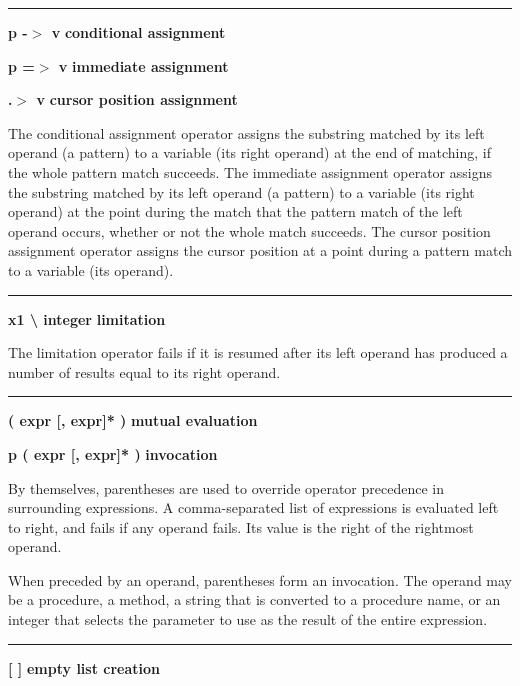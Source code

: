 \bigskip\hrule\vspace{0.1cm}
\noindent
{\bf p -$>$ v } \hfill {\bf conditional assignment}

\noindent
{\bf p =$>$ v } \hfill {\bf immediate assignment}

\noindent
{\bf  .$>$ v } \hfill {\bf cursor position assignment}

\noindent
The  conditional assignment operator
assigns the substring matched by its left operand (a pattern) to a
variable (its right operand) at the end of matching, if the whole
pattern match succeeds.
The  immediate assignment operator assigns
the substring matched by its left operand (a pattern) to a variable
(its right operand) at the point during the match that the pattern
match of the left operand occurs, whether or not the whole match succeeds.
The cursor position assignment operator
assigns the cursor position at a point during a pattern match to a
variable (its operand).



\bigskip\hrule\vspace{0.1cm}
\noindent
{\bf x1 {\textbackslash} integer } \hfill {\bf limitation}

\noindent
The limitation operator fails if it
is resumed after its left operand has produced a number of results
equal to its right operand.

\bigskip\hrule\vspace{0.1cm}
\noindent
{\bf ( expr [, expr]* ) } \hfill {\bf mutual evaluation}

\noindent
{\bf p ( expr [, expr]* ) } \hfill {\bf invocation}

\noindent
By themselves, parentheses are used
to override operator precedence in surrounding expressions. A
comma-separated list of expressions is evaluated left to right, and
fails if any operand fails. Its value is the right of the rightmost
operand.

When preceded by an operand, parentheses form an
invocation. The operand may be a procedure,
a method, a string that is converted to a procedure name, or an integer
that selects the parameter to use as the result of the entire expression.

\bigskip\hrule\vspace{0.1cm}

\noindent
{\bf \textbf{[} \textbf{]} } \hfill {\bf empty list creation}

